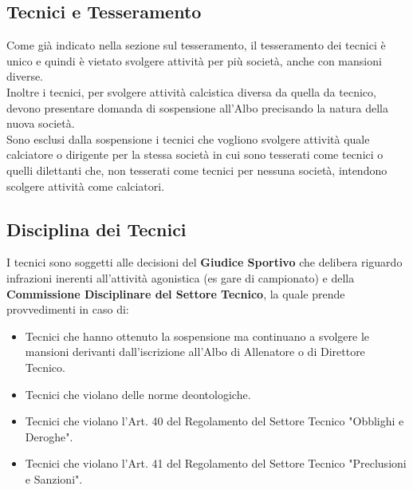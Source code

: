 \documentclass[../uefaC.tex]{subfiles}
\begin{document}
\subsection{Tecnici e Tesseramento}

Come già indicato nella sezione sul tesseramento, il tesseramento dei tecnici è unico e quindi è vietato svolgere attività per più società, anche con mansioni diverse. \hfill \\
Inoltre i tecnici, per svolgere attività calcistica diversa da quella da tecnico, devono presentare domanda di sospensione all'Albo precisando la natura della nuova società. \hfill \\
Sono esclusi dalla sospensione i tecnici che vogliono svolgere attività quale calciatore o dirigente per la stessa società in cui sono tesserati come tecnici o quelli dilettanti che, non tesserati come tecnici per nessuna società, intendono scolgere attività come calciatori.

\subsection{Disciplina dei Tecnici}

I tecnici sono soggetti alle decisioni del \textbf{Giudice Sportivo} che delibera riguardo infrazioni inerenti all'attività agonistica (es gare di campionato) e della \textbf{Commissione Disciplinare del Settore Tecnico}, la quale prende provvedimenti in caso di:
\begin{itemize}
    \item Tecnici che hanno ottenuto la sospensione ma continuano a svolgere le mansioni derivanti dall'iscrizione all'Albo di Allenatore o di Direttore Tecnico.
    \item Tecnici che violano delle norme deontologiche.
    \item Tecnici che violano l'Art. 40 del Regolamento del Settore Tecnico "Obblighi e Deroghe".
    \item Tecnici che violano l'Art. 41 del Regolamento del Settore Tecnico "Preclusioni e Sanzioni".
\end{itemize}
\end{document}
